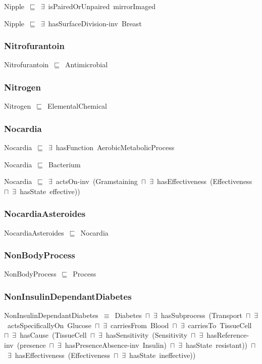 \documentclass{article}
\begin{document}
Nipple~\ensuremath{\sqsubseteq}~\ensuremath{\exists}~isPairedOrUnpaired~mirrorImaged~

Nipple~\ensuremath{\sqsubseteq}~\ensuremath{\exists}~hasSurfaceDivision-inv~Breast~

\subsubsection*{Nitrofurantoin}

Nitrofurantoin~\ensuremath{\sqsubseteq}~Antimicrobial~

\subsubsection*{Nitrogen}

Nitrogen~\ensuremath{\sqsubseteq}~ElementalChemical~

\subsubsection*{Nocardia}

Nocardia~\ensuremath{\sqsubseteq}~\ensuremath{\exists}~hasFunction~AerobicMetabolicProcess~

Nocardia~\ensuremath{\sqsubseteq}~Bacterium~

Nocardia~\ensuremath{\sqsubseteq}~\ensuremath{\exists}~actsOn-inv~(Gramstaining~\ensuremath{\sqcap}~\ensuremath{\exists}~hasEffectiveness~(Effectiveness~\ensuremath{\sqcap}~\ensuremath{\exists}~hasState~effective))~

\subsubsection*{NocardiaAsteroides}

NocardiaAsteroides~\ensuremath{\sqsubseteq}~Nocardia~

\subsubsection*{NonBodyProcess}

NonBodyProcess~\ensuremath{\sqsubseteq}~Process~

\subsubsection*{NonInsulinDependantDiabetes}

NonInsulinDependantDiabetes~\ensuremath{\equiv}~Diabetes~\ensuremath{\sqcap}~\ensuremath{\exists}~hasSubprocess~(Transport~\ensuremath{\sqcap}~\ensuremath{\exists}~actsSpecificallyOn~Glucose~\ensuremath{\sqcap}~\ensuremath{\exists}~carriesFrom~Blood~\ensuremath{\sqcap}~\ensuremath{\exists}~carriesTo~TissueCell~\ensuremath{\sqcap}~\ensuremath{\exists}~hasCause~(TissueCell~\ensuremath{\sqcap}~\ensuremath{\exists}~hasSensitivity~(Sensitivity~\ensuremath{\sqcap}~\ensuremath{\exists}~hasReference-inv~(presence~\ensuremath{\sqcap}~\ensuremath{\exists}~hasPresenceAbsence-inv~Insulin)~\ensuremath{\sqcap}~\ensuremath{\exists}~hasState~resistant))~\ensuremath{\sqcap}~\ensuremath{\exists}~hasEffectiveness~(Effectiveness~\ensuremath{\sqcap}~\ensuremath{\exists}~hasState~ineffective))
\end{document}
